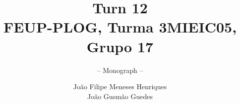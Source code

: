 \documentclass[envcountsame,envcountchap]{svmono}
\begin{document}
\author{João Filipe Meneses Henriques\\João Gusmão Guedes}
\title{Turn 12\\
{\small FEUP-PLOG, Turma 3MIEIC05, Grupo 17}}
\subtitle{-- Monograph --}
\maketitle

\frontmatter%

%
%

\tableofcontents


\mainmatter%



%

\backmatter%


\printindex

\end{document}
